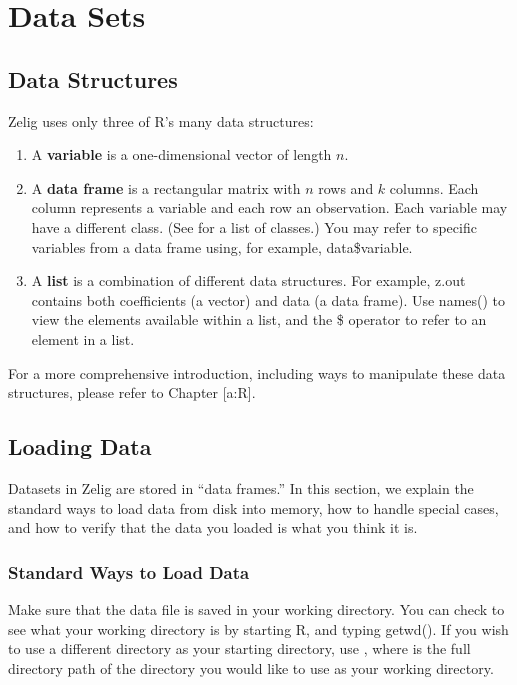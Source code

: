 \documentclass[letterpaper,10pt,english]{sphinxmanual}
\begin{document}
\section{Data Sets}
\label{3_data_analysis:data-sets}

\subsection{Data Structures}
\label{3_data_analysis:data-structures}
Zelig uses only three of R’s many data structures:
\begin{enumerate}
\item {} 
A \textbf{variable} is a one-dimensional vector of length \(n\).

\item {} 
A \textbf{data frame} is a rectangular matrix with \(n\) rows and
\(k\) columns. Each column represents a variable and each row an
observation. Each variable may have a different class. (See for a
list of classes.) You may refer to specific variables from a data
frame using, for example, data\$variable.

\item {} 
A \textbf{list} is a combination of different data structures. For
example, z.out contains both coefficients (a vector) and data (a data
frame). Use names() to view the elements available within a list, and
the \$ operator to refer to an element in a list.

\end{enumerate}

For a more comprehensive introduction, including ways to manipulate
these data structures, please refer to Chapter {[}a:R{]}.


\subsection{Loading Data}
\label{3_data_analysis:loading-data}
Datasets in Zelig are stored in “data frames.” In this section, we
explain the standard ways to load data from disk into memory, how to
handle special cases, and how to verify that the data you loaded is what
you think it is.


\subsubsection{Standard Ways to Load Data}
\label{3_data_analysis:standard-ways-to-load-data}
Make sure that the data file is saved in your working directory. You can
check to see what your working directory is by starting R, and typing
getwd(). If you wish to use a different directory as your starting
directory, use , where  is the full
directory path of the directory you would like to use as your working
directory.
\end{document}
